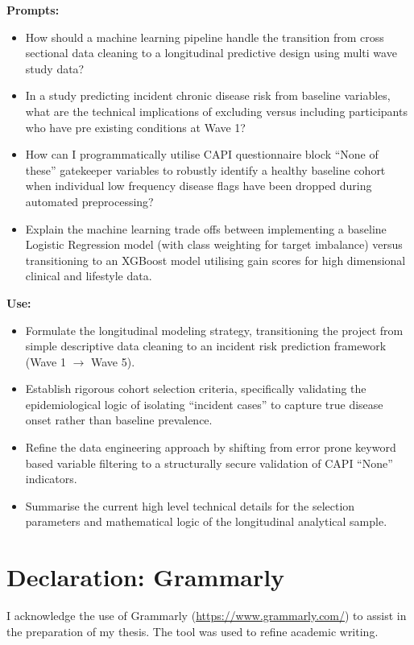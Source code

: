 \textbf{Prompts:}
\begin{itemize}
    \item[-] How should a machine learning pipeline handle the transition from cross sectional data cleaning to a longitudinal predictive design using multi wave study data?
    \item[-] In a study predicting incident chronic disease risk from baseline variables, what are the technical implications of excluding versus including participants who have pre existing conditions at Wave 1?
    \item[-] How can I programmatically utilise CAPI questionnaire block ``None of these'' gatekeeper variables to robustly identify a healthy baseline cohort when individual low frequency disease flags have been dropped during automated preprocessing?
    \item[-] Explain the machine learning trade offs between implementing a baseline Logistic Regression model (with class weighting for target imbalance) versus transitioning to an XGBoost model utilising gain scores for high dimensional clinical and lifestyle data.
\end{itemize}

\textbf{Use:}
\begin{itemize}
    \item[-] Formulate the longitudinal modeling strategy, transitioning the project from simple descriptive data cleaning to an incident risk prediction framework (Wave 1 $\rightarrow$ Wave 5).
    \item[-] Establish rigorous cohort selection criteria, specifically validating the epidemiological logic of isolating ``incident cases'' to capture true disease onset rather than baseline prevalence.
    \item[-] Refine the data engineering approach by shifting from error prone keyword based variable filtering to a structurally secure validation of CAPI ``None'' indicators.
    \item[-] Summarise the current high level technical details for the selection parameters and mathematical logic of the longitudinal analytical sample.
\end{itemize}

\section*{Declaration: Grammarly}
I acknowledge the use of Grammarly (\url{https://www.grammarly.com/}) to assist in the preparation of my thesis. The tool was used to refine academic writing.


